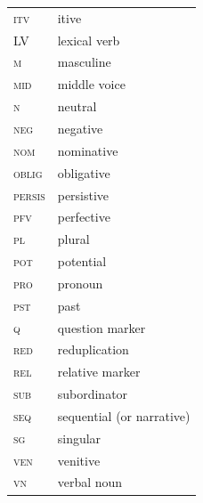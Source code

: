 \documentclass[output=paper,colorlinks,citecolor=brown,draftmode]{langscibook}
\begin{document}
\begin{tabularx}{.45\textwidth}{lQ}
\scshape itv & 	itive\\
LV & lexical verb \\
\scshape m & 	masculine\\
\scshape mid  & 	middle voice\\
\scshape n & 	neutral\\
\scshape neg & 	negative\\
\scshape nom	 & nominative\\
\scshape oblig & 	obligative\\
\scshape persis & 	persistive\\
\scshape pfv & 	perfective\\
\scshape pl & 	plural\\
\scshape pot  & 	potential\\
\scshape pro & pronoun \\
\scshape pst	 & past\\
\scshape q & 	question marker\\
\scshape red & 	reduplication\\
\scshape rel	 & relative marker\\
\scshape sub & 	subordinator\\
\scshape seq	 & sequential (or narrative)\\
\scshape sg & 	singular\\
\scshape ven	 & venitive\\
\scshape vn & 	verbal noun\\
\end{tabularx}


\sloppy\printbibliography[heading=subbibliography,notkeyword=this]
\end{document}
